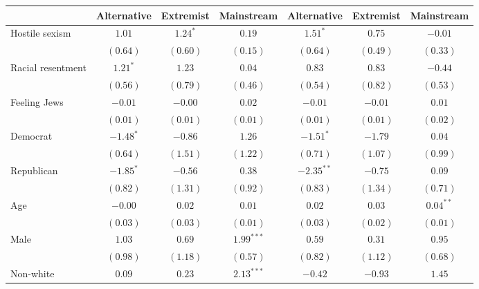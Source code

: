 
\usepackage{booktabs}

\begin{table}
\begin{center}
\begin{tabular}{l c c c c c c}
\toprule
 & Alternative & Extremist & Mainstream & Alternative & Extremist & Mainstream \\
\midrule
Hostile sexism    & $1.01$      & $1.24^{*}$   & $0.19$       & $1.51^{*}$   & $0.75$       & $-0.01$       \\
                  & $(0.64)$    & $(0.60)$     & $(0.15)$     & $(0.64)$     & $(0.49)$     & $(0.33)$      \\
Racial resentment & $1.21^{*}$  & $1.23$       & $0.04$       & $0.83$       & $0.83$       & $-0.44$       \\
                  & $(0.56)$    & $(0.79)$     & $(0.46)$     & $(0.54)$     & $(0.82)$     & $(0.53)$      \\
Feeling Jews      & $-0.01$     & $-0.00$      & $0.02$       & $-0.01$      & $-0.01$      & $0.01$        \\
                  & $(0.01)$    & $(0.01)$     & $(0.01)$     & $(0.01)$     & $(0.01)$     & $(0.02)$      \\
Democrat          & $-1.48^{*}$ & $-0.86$      & $1.26$       & $-1.51^{*}$  & $-1.79$      & $0.04$        \\
                  & $(0.64)$    & $(1.51)$     & $(1.22)$     & $(0.71)$     & $(1.07)$     & $(0.99)$      \\
Republican        & $-1.85^{*}$ & $-0.56$      & $0.38$       & $-2.35^{**}$ & $-0.75$      & $0.09$        \\
                  & $(0.82)$    & $(1.31)$     & $(0.92)$     & $(0.83)$     & $(1.34)$     & $(0.71)$      \\
Age               & $-0.00$     & $0.02$       & $0.01$       & $0.02$       & $0.03$       & $0.04^{**}$   \\
                  & $(0.03)$    & $(0.03)$     & $(0.01)$     & $(0.03)$     & $(0.02)$     & $(0.01)$      \\
Male              & $1.03$      & $0.69$       & $1.99^{***}$ & $0.59$       & $0.31$       & $0.95$        \\
                  & $(0.98)$    & $(1.18)$     & $(0.57)$     & $(0.82)$     & $(1.12)$     & $(0.68)$      \\
Non-white         & $0.09$      & $0.23$       & $2.13^{***}$ & $-0.42$      & $-0.93$      & $1.45$        \\

\end{tabular}
\end{center}
\end{table}

